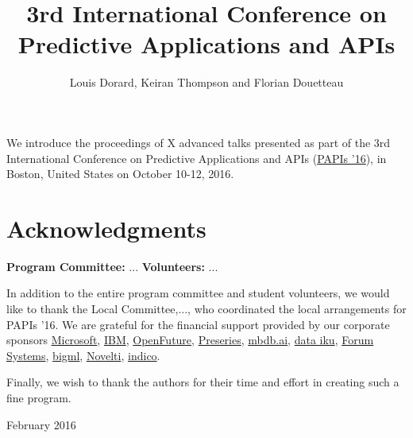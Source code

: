 \documentclass[wcp]{jmlrbook}
\title[PAPIs 2016]{3rd International Conference on Predictive Applications and APIs}
\author{Louis Dorard, Keiran Thompson and Florian Douetteau}
\subtitle{\thejmlrworkshop}
\begin{document}
\maketitle

\frontmatter

\begin{preface}

	We introduce the proceedings of X advanced talks presented as part of the 3rd International Conference on Predictive Applications and APIs (\href{http://papis.io/2016}{PAPIs '16}), in Boston, United States on October 10-12, 2016.

  \section*{Acknowledgments}

  \textbf{Program Committee:}
  ...
  \textbf{Volunteers:}
  ...

  In addition to the entire program committee and student volunteers, we would like to thank the Local Committee,..., who coordinated the local arrangements for PAPIs '16.
  We are grateful for the financial support provided by our corporate sponsors \href{http://microsoft.com}{Microsoft}, \href{http://ibm.com}{IBM}, \href{http://openfuture.org}{OpenFuture}, \href{http://preseries}{Preseries}, \href{http://mldb.ai}{mbdb.ai}, \href{http://dataiku.com}{data iku}, \href{http://forumsys.com}{Forum Systems}, \href{https://bigml.com}{bigml}, \href{http://novelti.io}{Novelti}, \href{https://indico.io}{indico}.

  Finally, we wish to thank the authors for their time and effort in creating such a fine program.

\begin{signoff}{February 2016}
\end{signoff}


\end{preface}

\tableofcontents

\mainmatter

\begin{jmlrpapers}
\end{jmlrpapers}
\end{document}
